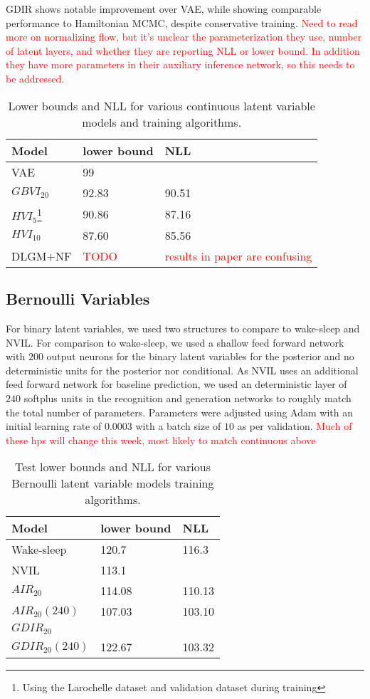 \documentclass{article} %
\newcommand{\alert}[1]{\textcolor{red}{#1}}
\begin{document}
GDIR shows notable improvement over VAE, while showing comparable performance to Hamiltonian MCMC, despite conservative training. \alert{Need to read more on normalizing flow, but it's unclear the parameterization they use, number of latent layers, and whether they are reporting NLL or lower bound. In addition they have more parameters in their auxiliary inference network, so this needs to be addressed.}

\begin{table}
\label{table:continuous}
\begin{tabular}{ | m{6em} | m{1cm}| m{5cm} | } 
\hline
Model & lower bound & NLL \\ 
\hline
\hline
VAE & 99 &  \\ 
\hline
$GBVI_{20}$ & 92.83 & 90.51 \\ 
\hline
\hline
$HVI_5$\footnote[1]{Using the Larochelle dataset and validation dataset during training} &  90.86 & 87.16 \\ 
$HVI_{10}$\footnote[1] & 87.60 & 85.56 \\ 
DLGM+NF & \alert{TODO} & \alert{results in paper are confusing} \\
\hline
\end{tabular}
\caption{Lower bounds and NLL for various continuous latent variable models and training algorithms.}
\end{table}

\subsection{Bernoulli Variables}
For binary latent variables, we used two structures to compare to wake-sleep and NVIL. For comparison to wake-sleep, we used a shallow feed forward network with $200$ output neurons for the binary latent variables for the posterior and no deterministic units for the posterior nor conditional. As NVIL uses an additional feed forward network for baseline prediction, we used an deterministic layer of $240$ softplus units in the recognition and generation networks to roughly match the total number of parameters. Parameters were adjusted using Adam \citep{kingma2014method} with an initial learning rate of \num{0.0003} with a batch size of $10$ as per validation. \alert{Much of these hps will change this week, most likely to match continuous above}

\begin{table}
\label{table:binary}
\begin{tabular}{ | m{6em} | m{1cm}| m{1cm} | } 
\hline
Model & lower bound & NLL \\ 
\hline
\hline
Wake-sleep & 120.7 & 116.3 \\ 
\hline
NVIL & 113.1 &  \\ 
\hline
$AIR_{20}$ & 114.08 & 110.13 \\
$AIR_{20}(240)$ & 107.03 & 103.10 \\
\hline
$GDIR_{20}$ &  &  \\
$GDIR_{20}(240)$ & 122.67  & 103.32 \\
\hline
\end{tabular}
\caption{Test lower bounds and NLL for various Bernoulli latent variable models training algorithms.}
\end{table}
\end{document}
